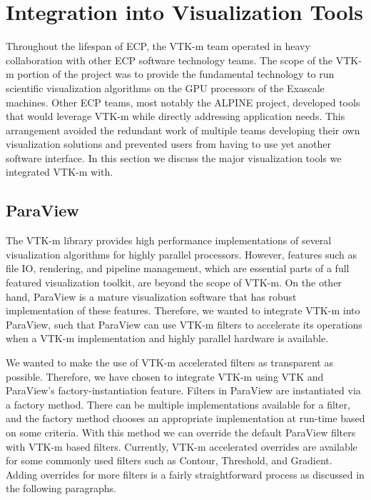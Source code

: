 \section{Integration into Visualization Tools}

Throughout the lifespan of ECP, the VTK-m team operated in heavy collaboration with other ECP software technology teams.
The scope of the VTK-m portion of the project was to provide the fundamental technology to run scientific visualization algorithms on the GPU processors of the Exascale machines.
Other ECP teams, most notably the ALPINE project, developed tools that would leverage VTK-m while directly addressing application needs.
This arrangement avoided the redundant work of multiple teams developing their own visualization solutions and prevented users from having to use yet another software interface.
In this section we discuss the major visualization tools we integrated VTK-m with.


\subsection{ParaView}

The VTK-m library provides high performance implementations of several visualization algorithms for highly parallel processors. However, features such as file IO, rendering, and pipeline management, which are essential parts of a full featured visualization toolkit, are beyond the scope of VTK-m. On the other hand, ParaView is a mature visualization software that has robust implementation of these features. Therefore, we wanted to integrate VTK-m into ParaView, such that ParaView can use VTK-m filters to accelerate its operations when a VTK-m implementation and highly parallel hardware is available.

We wanted to make the use of VTK-m accelerated filters as transparent as possible. Therefore, we have chosen to integrate VTK-m using VTK and ParaView's factory-instantiation feature. Filters in ParaView are instantiated via a factory method. There can be multiple implementations available for a filter, and the factory method chooses an appropriate implementation at run-time based on some criteria. With this method we can override the default ParaView filters with VTK-m based filters. Currently, VTK-m accelerated overrides are available for some commonly used filters such as Contour, Threshold, and Gradient. Adding overrides for more filters is a fairly straightforward process as discussed in the following paragraphs.

